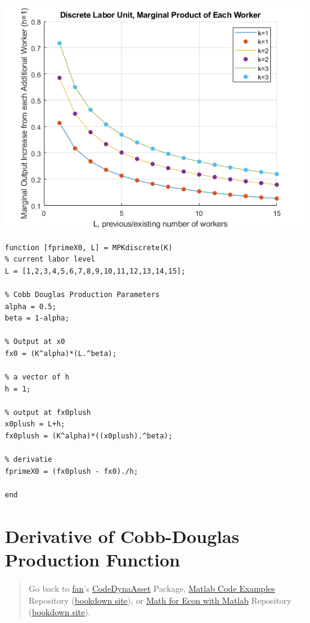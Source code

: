 \documentclass[
]{book}
\begin{document}
\includegraphics[width=5.20833in,height=\textheight]{img/derivative_MPL_discrete_workers_images/figure_1.png}

\begin{verbatim}
function [fprimeX0, L] = MPKdiscrete(K)
% current labor level
L = [1,2,3,4,5,6,7,8,9,10,11,12,13,14,15];

% Cobb Douglas Production Parameters
alpha = 0.5;
beta = 1-alpha;

% Output at x0
fx0 = (K^alpha)*(L.^beta);

% a vector of h
h = 1;

% output at fx0plush
x0plush = L+h;
fx0plush = (K^alpha)*((x0plush).^beta);

% derivatie 
fprimeX0 = (fx0plush - fx0)./h;

end
\end{verbatim}

\hypertarget{derivative-of-cobb-douglas-production-function}{%
\section{Derivative of Cobb-Douglas Production Function}\label{derivative-of-cobb-douglas-production-function}}

\begin{quote}
Go back to \href{http://fanwangecon.github.io/}{fan}'s \href{https://fanwangecon.github.io/CodeDynaAsset/}{CodeDynaAsset} Package, \href{https://fanwangecon.github.io/M4Econ/}{Matlab Code Examples} Repository (\href{https://fanwangecon.github.io/M4Econ/bookdown}{bookdown site}), or \href{https://fanwangecon.github.io/Math4Econ/}{Math for Econ with Matlab} Repository (\href{https://fanwangecon.github.io/Math4Econ/bookdown}{bookdown site}).
\end{quote}
\end{document}
